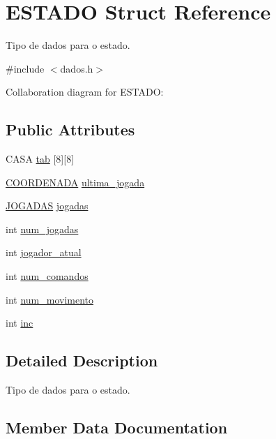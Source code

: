 \hypertarget{structESTADO}{}\section{E\+S\+T\+A\+DO Struct Reference}
\label{structESTADO}


Tipo de dados para o estado.  




{\ttfamily \#include $<$dados.\+h$>$}



Collaboration diagram for E\+S\+T\+A\+DO\+:
\subsection*{Public Attributes}
\begin{DoxyCompactItemize}
\item 
C\+A\+SA \hyperlink{structESTADO_ab56f0f1be16954d3768b4174d14c087d}{tab} \mbox{[}8\mbox{]}\mbox{[}8\mbox{]}
\item 
\hyperlink{structCOORDENADA}{C\+O\+O\+R\+D\+E\+N\+A\+DA} \hyperlink{structESTADO_a4896a5c5c1f40b43fb795623327e3f47}{ultima\+\_\+jogada}
\item 
\hyperlink{dados_8h_a94c221d29a1760f008b7834093259b7d}{J\+O\+G\+A\+D\+AS} \hyperlink{structESTADO_afae43b87a488fad0f2b56a18bad31d18}{jogadas}
\item 
int \hyperlink{structESTADO_a261495728744647e618b4e623f5a4b7a}{num\+\_\+jogadas}
\item 
int \hyperlink{structESTADO_a5dd28e2e68b7aef2b6b7ea88e02eff58}{jogador\+\_\+atual}
\item 
int \hyperlink{structESTADO_abe6faacdd6111160bf9a354f44b95b38}{num\+\_\+comandos}
\item 
int \hyperlink{structESTADO_a2a04cf6054f85e3dbee5fb8cc08e7264}{num\+\_\+movimento}
\item 
int \hyperlink{structESTADO_a5ecb2febdc1bc87fcd87fdb22fffd237}{inc}
\end{DoxyCompactItemize}


\subsection{Detailed Description}
Tipo de dados para o estado. 

\subsection{Member Data Documentation}
\mbox{\label{structESTADO_a5ecb2febdc1bc87fcd87fdb22fffd237}} 
